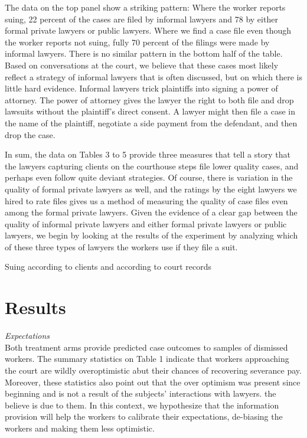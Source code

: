 \documentclass[oneside,12pt]{article}
\begin{document}
The data on the top panel show a striking pattern: Where the worker reports suing, 22 percent of the cases are filed by informal lawyers and 78 by either formal private lawyers or public lawyers. Where we find a case file even though the worker reports not suing, fully 70 percent of the filings were made by informal lawyers. There is no similar pattern in the bottom half of the table. Based on conversations at the court, we believe that these cases most likely reflect a strategy of informal lawyers that is often discussed, but on which there is little hard evidence. Informal lawyers trick plaintiffs into signing a power of attorney. The power of attorney gives the lawyer the right to both file and drop lawsuits without the plaintiff’s direct consent. A lawyer might then file a case in the name of the plaintiff, negotiate a side payment from the defendant, and then drop the case. 

In sum, the data on Tables 3 to 5 provide three measures that tell a story that the lawyers capturing clients on the courthouse steps file lower quality cases, and perhaps even follow quite deviant strategies. Of course, there is variation in the quality of formal private lawyers as well, and the ratings by the eight lawyers we hired to rate files gives us a method of measuring the quality of case files even among the formal private lawyers. Given the evidence of a clear gap between the quality of informal private lawyers and either formal private lawyers or public lawyers, we begin by looking at the results of the experiment by analyzing which of these three types of lawyers the workers use if they file a suit. 
\\



\begin{table}[!ht]
    \caption{Suing according to clients and according to court records}
    \label{suing_clientsVSrecords}
    \center
    

  
\end{table}

\section{Results}

\emph{Expectations}\\
Both treatment arms provide predicted case outcomes to samples of dismissed workers. The summary statistics on Table 1 indicate that workers approaching the court are wildly overoptimistic abut their chances of recovering severance pay. Moreover, these statistics also point out that the over optimism was present since beginning and is not a result of the subjects’ interactions with lawyers. the believe is due to them. In this context, we hypothesize that the information provision will help the workers to calibrate their expectations, de-biasing the workers and making them less optimistic. 
\end{document}
